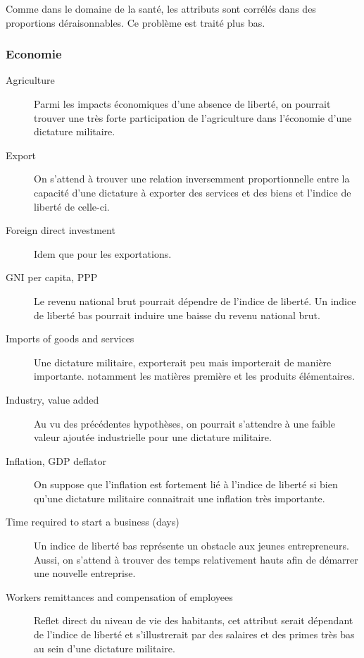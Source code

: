 Comme dans le domaine de la santé, les attributs sont corrélés dans des proportions déraisonnables. Ce problème est traité plus bas.

\subsubsection{Economie}
\begin{description}
\item [Agriculture]
Parmi les impacts économiques d'une absence de liberté, on pourrait trouver une très forte participation de l'agriculture dans l'économie d'une dictature militaire.
\item [Export]
On s'attend à trouver une relation inversemment proportionnelle entre la capacité d'une dictature à exporter des services et des biens et l'indice de liberté de celle-ci.
\item [Foreign direct investment]
Idem que pour les exportations. 
\item [GNI per capita, PPP ]
Le revenu national brut pourrait dépendre de l'indice de liberté. Un indice de liberté bas pourrait induire une baisse du revenu national brut.
\item [Imports of goods and services] 
Une dictature militaire, exporterait peu mais importerait de manière importante. notamment les matières première et les produits élémentaires.
\item [Industry, value added]
Au vu des précédentes hypothèses, on pourrait s'attendre à une faible valeur ajoutée industrielle pour une dictature militaire. 
\item [Inflation, GDP deflator] 
On suppose que l'inflation est fortement lié à l'indice de liberté si bien qu'une dictature militaire connaitrait une inflation très importante.

\item [Time required to start a business (days)]
Un indice de liberté bas représente un obstacle aux jeunes entrepreneurs. Aussi, on s'attend à trouver des temps relativement hauts afin de démarrer une nouvelle entreprise. 
\item [Workers remittances and compensation of employees]
Reflet direct du niveau de vie des habitants, cet attribut serait dépendant de l'indice de liberté et s'illustrerait par des salaires et des primes très bas au sein d'une dictature militaire.

\end{description}

